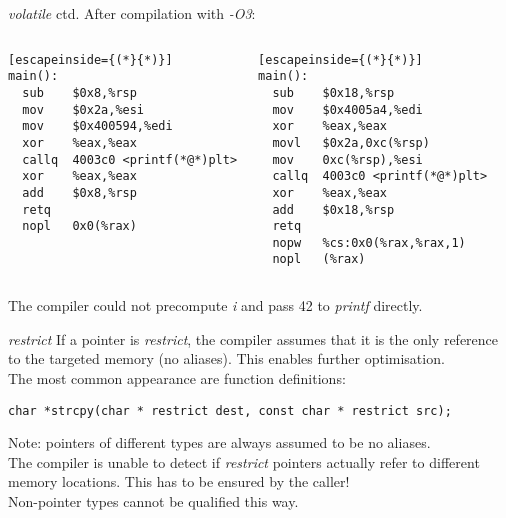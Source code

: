 \begin{frame}[fragile]{\textit{volatile} ctd.}
After compilation with \textit{-O3}:
\begin{columns}
	\begin{lstlisting}[escapeinside={(*}{*)}]
main():
  sub    $0x8,%rsp
  mov    $0x2a,%esi
  mov    $0x400594,%edi
  xor    %eax,%eax
  callq  4003c0 <printf(*@*)plt>
  xor    %eax,%eax
  add    $0x8,%rsp
  retq   
  nopl   0x0(%rax)
\end{lstlisting}
	\begin{lstlisting}[escapeinside={(*}{*)}]
main():
  sub    $0x18,%rsp
  mov    $0x4005a4,%edi
  xor    %eax,%eax
  movl   $0x2a,0xc(%rsp) 
  mov    0xc(%rsp),%esi
  callq  4003c0 <printf(*@*)plt>
  xor    %eax,%eax
  add    $0x18,%rsp
  retq   
  nopw   %cs:0x0(%rax,%rax,1)
  nopl   (%rax)
\end{lstlisting}
\end{columns}
\bigskip
\pause
The compiler could not precompute \textit{i} and pass 42 to \textit{printf} directly.
\end{frame}

\begin{frame}[fragile]{\textit{restrict}}
If a pointer is \textit{restrict}, the compiler assumes that it is the only reference\\
to the targeted memory (no aliases). This enables further optimisation.\\
\bigskip
The most common appearance are function definitions:
\begin{lstlisting}[basicstyle=\scriptsize]
char *strcpy(char * restrict dest, const char * restrict src);
\end{lstlisting}
Note: pointers of different types are always assumed to be no aliases.\\
\bigskip
The compiler is unable to detect if \textit{restrict} pointers actually refer to different memory locations. This has to be ensured by the caller!\\
\bigskip
Non-pointer types cannot be qualified this way.
\end{frame}



